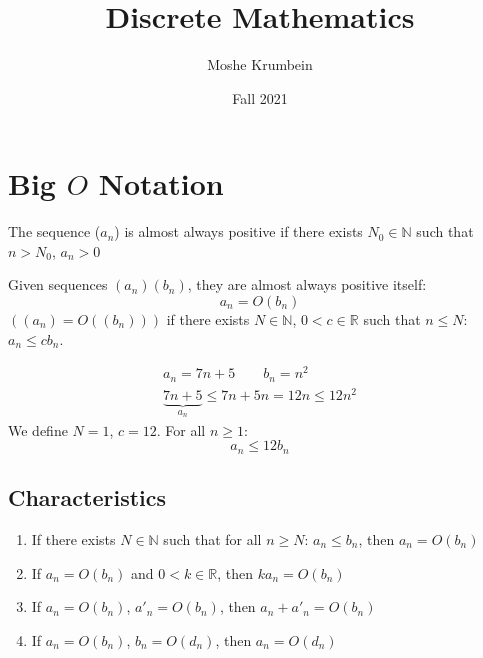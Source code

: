 \documentclass[00_complete]{subfiles}
\title{Discrete Mathematics}
\author{Moshe Krumbein}
\date{Fall 2021}
\begin{document}

\section{Big \texorpdfstring{$O$}{O} Notation}
\begin{definition}
    The sequence ($a_n$) is almost always positive if there exists $N_0\in
    \mathbb{N}$ such that $n>N_0$, $a_n>0$
\end{definition}
\begin{definition}
    Given sequences $(a_n)(b_n)$, they are almost always positive itself:
    $$a_n=O(b_n)$$
    $((a_n)=O((b_n)))$ if there exists $N \in \mathbb{N}$, $0 <c \in
    \mathbb{R}$ such that $n \leq N$: $a_n \leq cb_n$.
\end{definition}
\begin{example}
    \begin{gather*}
    a_n=7n+5 \qquad b_n=n^2 \\
    \underbrace{7n+5}_{a_n} \leq 7n+5n = 12n \leq 12n^2
    \end{gather*}
    We define $N=1$, $c=12$. For all $n\geq 1$:
    $$a_n \leq 12b_n$$
\end{example}
\subsection{Characteristics}
\begin{enumerate}
    \item If there exists $N \in \mathbb{N}$ such that for all $n \geq N$: $a_n
        \leq b_n$, then $a_n = O(b_n)$
    \item If $a_n = O(b_n)$ and $0 < k \in \mathbb{R}$, then $ka_n=O(b_n)$
    \item If $a_n=O(b_n)$, $a'_n=O(b_n)$, then $a_n+a'_n=O(b_n)$
    \item If $a_n=O(b_n)$, $b_n=O(d_n)$, then $a_n = O(d_n)$
\end{enumerate}
\end{document}
